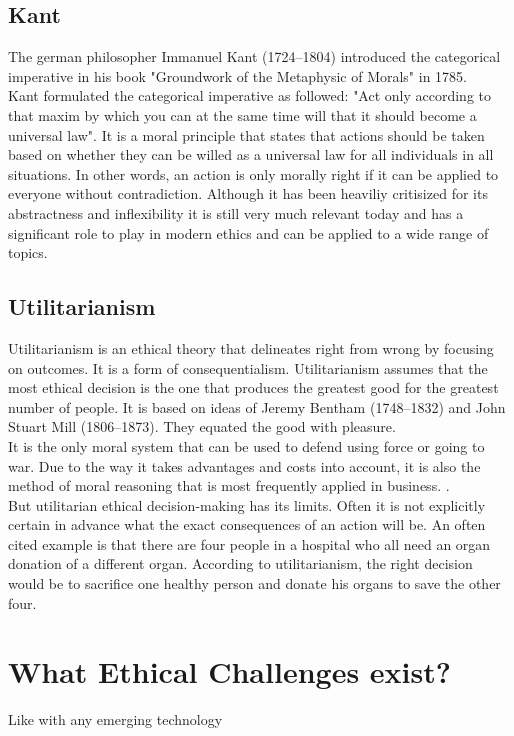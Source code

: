 \documentclass[9pt,twocolumn,twoside]{osajnl}
\begin{document}
\subsection{Kant}
The german philosopher Immanuel Kant (1724--1804) introduced the categorical imperative in his book "Groundwork of the Metaphysic of Morals" in 1785. \\
Kant formulated the categorical imperative as followed: "Act only according to that maxim by which you can at the same time will that it should become a universal law". 
It is a moral principle that states that actions should be taken based on whether they can be willed as a universal law for all individuals in all situations. 
In other words, an action is only morally right if it can be applied to everyone without contradiction.
Although it has been heaviliy critisized for its abstractness and inflexibility it is still very much relevant today and has a significant role to play in modern ethics and can be applied to a wide range of topics.

\subsection{Utilitarianism}
Utilitarianism is an ethical theory that delineates right from wrong by focusing on outcomes. It is a form of consequentialism.
Utilitarianism assumes that the most ethical decision is the one that produces the greatest good for the greatest number of people. It is based on ideas of Jeremy Bentham (1748--1832) and John Stuart Mill (1806--1873). They equated the good with pleasure.\\
It is the only moral system that can be used to defend using force or going to war. Due to the way it takes advantages and costs into account, it is also the method of moral reasoning that is most frequently applied in business. \cite{EthicsUnwrapped}. \\
But utilitarian ethical decision-making has its limits. Often it is not explicitly certain in advance what the exact consequences of an action will be. 
An often cited example is that there are four people in a hospital who all need an organ donation of a different organ. According to utilitarianism, the right decision would be to sacrifice one healthy person and donate his organs to save the other four.

\section{What Ethical Challenges exist?}
Like with any emerging technology 
\end{document}

